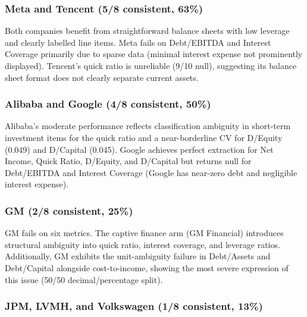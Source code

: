 \documentclass[12pt, a4paper]{article}
\begin{document}
\subsubsection{Meta and Tencent (5/8 consistent, 63\%)}

Both companies benefit from straightforward balance sheets with low leverage
and clearly labelled line items.  Meta fails on Debt/EBITDA and Interest
Coverage primarily due to sparse data (minimal interest expense not prominently
displayed).  Tencent's quick ratio is unreliable (9/10 null), suggesting
its balance sheet format does not clearly separate current assets.

\subsubsection{Alibaba and Google (4/8 consistent, 50\%)}

Alibaba's moderate performance reflects classification ambiguity in short-term
investment items for the quick ratio and a near-borderline CV for D/Equity
(0.049) and D/Capital (0.045).  Google achieves perfect extraction for
Net Income, Quick Ratio, D/Equity, and D/Capital but returns null for
Debt/EBITDA and Interest Coverage (Google has near-zero debt and negligible
interest expense).

\subsubsection{GM (2/8 consistent, 25\%)}

GM fails on six metrics.  The captive finance arm (GM Financial) introduces
structural ambiguity into quick ratio, interest coverage, and leverage ratios.
Additionally, GM exhibits the unit-ambiguity failure in Debt/Assets and
Debt/Capital alongside cost-to-income, showing the most severe expression of
this issue (50/50 decimal/percentage split).

\subsubsection{JPM, LVMH, and Volkswagen (1/8 consistent, 13\%)}
\end{document}
